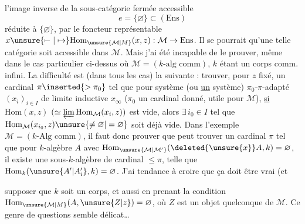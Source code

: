 l'image inverse de la sous-catégorie fermée accessible 
\[
e=\{\varnothing\}\subset(\mathrm{Ens})
\]
réduite à $\{\varnothing\}$, par le foncteur représentable
$x\unsure{\mapstochar\relbar|\mapsto}\mathrm{Hom}_{\unsure{\mathcal M|M}}(x,z):\mathcal M\to\mathrm{Ens}$. Il se pourrait  qu'une telle catégorie soit  accessible dans $\mathcal M$. Mais j'ai été incapable de le prouver, même dans le cas particulier ci-dessus où $\mathcal M=(k\text{-alg comm})$, $k$ étant un corps comm. infini. La difficulté est (dans tous les cas) la suivante : trouver,
pour $z$ fixé, un cardinal $\pi\inserted{>\pi_0}$ tel que pour   système (ou \uline{un} système) $\pi_0$-$\pi$-adapté $(x_i)_{i\in I}$ de limite inductive $x_{\infty}$ ($\pi_0$ un cardinal donné, utile pour $\mathcal M$),
\uline{si} $\mathrm{Hom}(x,z)$  $(\simeq\varprojlim\mathrm{Hom}_{\mathcal M}(x_i,z))$ est vide, alors $\exists\,i_0\in I$ tel que
$\mathrm{Hom}_{\mathcal M}(x_{i_0},z)\unsure{\ne\varnothing|=\varnothing}$
soit déjà vide. Dans l'exemple $\mathcal M=(k\text{-Alg comm})$, il faut donc prouver que  peut trouver un cardinal $\pi$ tel que pour  $k$-algèbre $A$ avec
$\mathrm{Hom}_{\unsure{\mathcal M|\mathcal M'}}(\deleted{\unsure{x}}A,k)=\varnothing$, il existe une sous-$k$-algèbre  de cardinal $\leq\pi$, telle
que $\mathrm{Hom}_{k}(\unsure{A'|A'_i},k)=\varnothing$. J'ai  tendance à croire que ça doit être vrai (et  

supposer que $k$ soit un corps, et aussi en prenant la condition $\mathrm{Hom}_{\unsure{\mathcal M|M}}(A,\unsure{Z|z})=\varnothing$, où $Z$ est un objet quelconque de $\mathcal M$. Ce genre de questions semble  délicat\ldots

